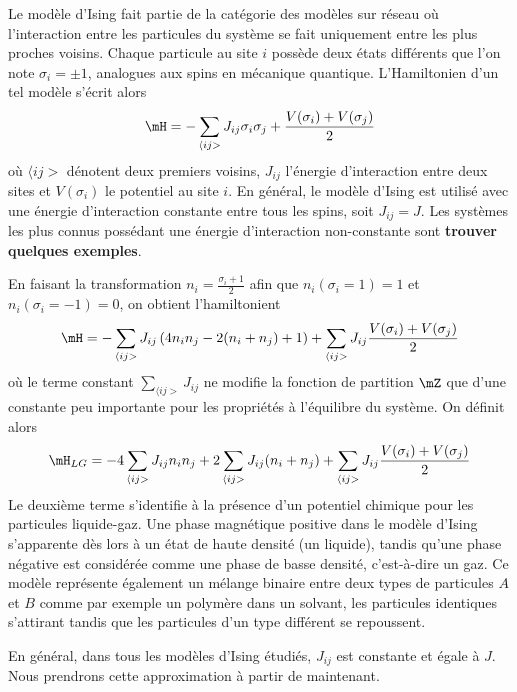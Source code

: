   	Le modèle d'Ising fait partie de la catégorie des modèles sur réseau où l'interaction entre les particules du système se fait uniquement entre les plus proches voisins. Chaque particule au site $i$ possède deux états différents que l'on note $\sigma_i = \pm 1$, analogues aux spins en mécanique quantique. L'Hamiltonien d'un tel modèle s'écrit alors
\begin{equation}
	\mH =  - \sum_{\langle i j >} J_{ij} \sigma_i \sigma_j + \frac{V(\sigma_i)+V(\sigma_j)}{2}
\end{equation}
où $\langle ij >$ dénotent deux premiers voisins, $J_{ij}$ l'énergie d'interaction entre deux sites et $V(\sigma_i)$ le potentiel au site $i$.
En général, le modèle d'Ising est utilisé avec une énergie d'interaction constante entre tous les spins, soit $J_{ij} = J$. Les systèmes les plus connus possédant une énergie d'interaction non-constante sont  \textbf{trouver quelques exemples}.

En faisant la transformation\cite{ref23David} $n_i =  \frac{\sigma_i +1}{2}$ afin que $n_i(\sigma_i = 1) = 1$ et $n_i(\sigma_i = -1) = 0$, on obtient l'hamiltonient
\begin{equation}
	\mH =  - \sum_{\langle i j >}  J_{ij} \left( 4 n_i n_j -2 ( n_i+n_j) + 1 \right)+ \sum_{\langle i j >}  J_{ij} \frac{V(\sigma_i)+V(\sigma_j)}{2}  
\end{equation}
où le terme constant $\sum_{\langle i j >}  J_{ij}$ ne modifie la fonction de partition $\mZ$ que d'une constante peu importante pour les propriétés à l'équilibre du système. On définit alors 
\begin{equation}
	\mH_{LG} =  - 4 \sum_{\langle i j >}  J_{ij}  n_i n_j  + 2 \sum_{\langle i j >}  J_{ij}  (n_i+n_j) + \sum_{\langle i j >}  J_{ij} \frac{V(\sigma_i)+V(\sigma_j)}{2}  
\end{equation}
Le deuxième terme s'identifie à la présence d'un potentiel chimique pour les particules liquide-gaz. Une phase magnétique positive dans le modèle d'Ising s'apparente dès lors à un état de haute densité (un liquide), tandis qu'une phase négative est considérée comme une phase de basse densité, c'est-à-dire un gaz.
Ce modèle représente également un mélange binaire\cite{} entre deux types de particules $A$ et $B$ comme par exemple un polymère dans un solvant, les particules identiques s'attirant tandis que les particules d'un type différent se repoussent. 

En général, dans tous les modèles d'Ising étudiés, $J_{ij}$ est constante et égale à $J$. Nous prendrons cette approximation à partir de maintenant.

